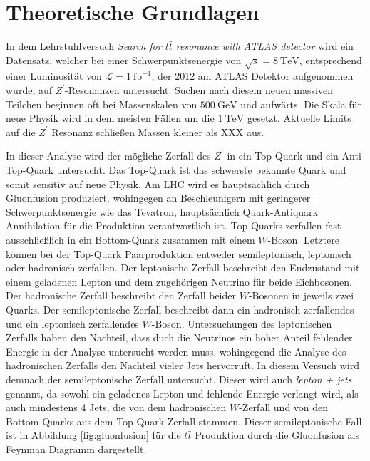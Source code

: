 \section{Theoretische Grundlagen}
\label{sec:theorie}

In dem Lehrstuhlversuch \textit{Search for $t\bar{t}$ resonance with ATLAS detector} wird ein Datensatz, welcher bei
einer Schwerpunktsenergie von $\sqrt{s} = \SI{8}{\tera\electronvolt}$, entsprechend einer Luminosität von
$\mathcal{L} = \SI{1}{\femto\barn}^{-1}$, der 2012 am ATLAS Detektor aufgenommen wurde, auf $Z^\prime$-Resonanzen untersucht.
Suchen nach diesem neuen massiven Teilchen beginnen oft bei Massenskalen von $\SI{500}{\giga\electronvolt}$ und aufwärts. Die
Skala für neue Physik wird in dem meisten Fällen um die $\SI{1}{\tera\electronvolt}$ gesetzt. Aktuelle Limits auf die
$Z^\prime$ Resonanz schließen Massen kleiner als XXX aus. \par

In dieser Analyse wird der mögliche Zerfall des $Z^\prime$ in ein Top-Quark und ein Anti-Top-Quark untersucht. Das Top-Quark
ist das schwerste bekannte Quark und somit sensitiv auf neue Physik. Am LHC wird es hauptsächlich durch Gluonfusion
produziert, wohingegen an Beschleunigern mit geringerer Schwerpunktsenergie wie das Tevatron, hauptsächlich Quark-Antiquark
Annihilation für die Produktion verantwortlich ist. Top-Quarks
zerfallen fast ausschließlich in ein Bottom-Quark zusammen mit einem $W$-Boson. Letztere können bei der
Top-Quark Paarproduktion entweder semileptonisch,
leptonisch oder hadronisch zerfallen. Der leptonische Zerfall beschreibt den Endzustand mit einem geladenen Lepton und
dem zugehörigen Neutrino für beide Eichbosonen. Der hadronische Zerfall beschreibt den Zerfall beider $W$-Bosonen in
jeweils zwei Quarks. Der semileptonische Zerfall beschreibt dann ein hadronisch zerfallendes und ein leptonisch
zerfallendes  $W$-Boson. Untersuchungen des leptonischen Zerfalls haben den Nachteil, dass duch die Neutrinos ein hoher Anteil fehlender
Energie in der Analyse untersucht werden muss, wohingegend die Analyse des hadronischen Zerfalls den Nachteil vieler Jets
hervorruft.
In diesem Versuch wird demnach der semileptonische Zerfall untersucht.
Dieser wird auch \textit{lepton + jets} genannt,
da sowohl ein geladenes Lepton und fehlende Energie verlangt wird, als auch mindestens 4 Jets, die von dem hadronischen $W$-Zerfall und von den Bottom-Quarks
aus dem Top-Quark-Zerfall stammen.
Dieser semileptonische Fall ist in Abbildung \ref{fig:gluonfusion} für die $t\bar{t}$ Produktion durch die Gluonfusion als Feynman Diagramm dargestellt.  \par

